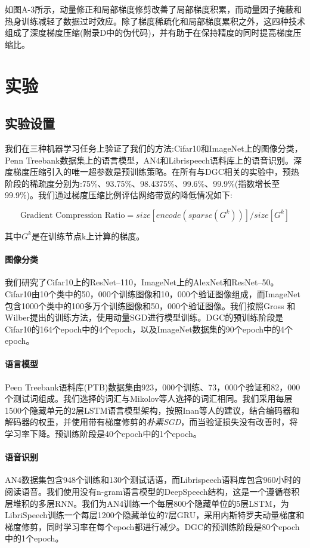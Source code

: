 如图A-3所示，动量修正和局部梯度修剪改善了局部梯度积累，而动量因子掩蔽和热身训练减轻了数据过时效应。除了梯度稀疏化和局部梯度累积之外，这四种技术组成了深度梯度压缩(附录D中的伪代码)，并有助于在保持精度的同时提高梯度压缩比。

\section{实验}
\subsection{实验设置}
我们在三种机器学习任务上验证了我们的方法:Cifar10和ImageNet上的图像分类，Penn Treebank数据集上的语言模型，AN4和Librispeech语料库上的语音识别。深度梯度压缩引入的唯一超参数是预训练策略。在所有与DGC相关的实验中，预热阶段的稀疏度分别为:75\%、93.75\%、98.4375\%、99.6\%、99.9\%(指数增长至99.9\%)。我们通过梯度压缩比例评估网络带宽的降低情况如下:

\begin{equation*}
  \text{Gradient Compression Ratio} = size\left[encode\left(sparse({G}^k)\right)\right] / size\left[ G^k \right]
\end{equation*}

其中$G^k$是在训练节点k上计算的梯度。

\paragraph{图像分类}
我们研究了Cifar10上的ResNet--110，ImageNet上的AlexNet和ResNet--50。Cifar10由10个类中的50，000个训练图像和10，000个验证图像组成，而ImageNet包含1000个类中的100多万个训练图像和50，000个验证图像。我们按照Gross 和 Wilber提出的训练方法，使用动量SGD进行模型训练。DGC的预训练阶段是Cifar10的164个epoch中的4个epoch，以及ImageNet数据集的90个epoch中的4个epoch。

\paragraph{语言模型}
Peen Treebank语料库(PTB)数据集由923，000个训练、73，000个验证和82，000个测试词组成。我们选择的词汇与Mikolov等人选择的词汇相同。我们采用每层1500个隐藏单元的2层LSTM语言模型架构，按照Inan等人的建议，结合编码器和解码器的权重，并使用带有梯度修剪的\emph{朴素SGD}，而当验证损失没有改善时，将学习率下降。预训练阶段是40个epoch中的1个epoch。

\paragraph{语音识别}
AN4数据集包含948个训练和130个测试话语，而Librispeech语料库包含960小时的阅读语音。我们使用没有n-gram语言模型的DeepSpeech结构，这是一个遵循卷积层堆积的多层RNN。我们为AN4训练一个每层800个隐藏单位的5层LSTM，为LibriSpeech训练一个每层1200个隐藏单位的7层GRU，采用内斯特罗夫动量梯度和梯度修剪，同时学习率在每个epoch都进行减少。DGC的预训练阶段是80个epoch中的1个epoch。

